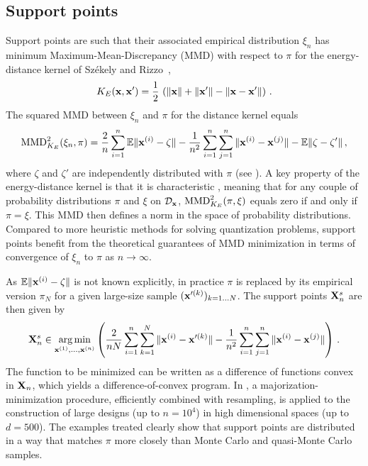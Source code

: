 \subsection{Support points}\label{sec:SP}
Support points \citep{mak_joseph_2018} are such that their associated empirical distribution $\xi_n$ has minimum Maximum-Mean-Discrepancy (MMD) with respect to $\pi$ for the energy-distance kernel of Sz\'ekely and Rizzo~\citep{szekely_rizzo_2013},
\begin{equation}\label{eq:kE}
K_E({\bf x},{\bf x}') = \frac12\, \left(\Vert {\bf x} \Vert + \Vert {\bf x}' \Vert - \Vert {\bf x}-{\bf x}' \Vert\right)\,.
\end{equation} 
The squared MMD between $\xi_n$ and $\pi$ for the distance kernel equals
\begin{equation}\label{eq:energySP}
\mathrm{MMD}_{K_E}^2(\xi_n,\pi) = \frac{2}{n} \sum_{i=1}^{n} \mathbb{E} \|{\bf x}^{(i)}-\zeta\| - \frac{1}{n^2} \sum_{i=1}^{n}\sum_{j=1}^{n} \|{\bf x}^{(i)}-{\bf x}^{(j)}\| - \mathbb{E} \|\zeta-\zeta'\| \,,
\end{equation}
where $\zeta$ and $\zeta'$ are independently distributed with $\pi$ (see \citealp{sejdinovic_2013}).
A key property of the energy-distance kernel is that it is characteristic \citep{sriperumbudur_2010}, meaning that for any couple of probability distributions $\pi$ and $\xi$ on $\mathcal{D}_{\bf x}$, $\mathrm{MMD}_{K_E}^2(\pi,\xi)$ equals zero if and only if $\pi=\xi$. 
This MMD then defines a norm in the space of probability distributions.
Compared to more heuristic methods for solving quantization problems, support points benefit from the theoretical guarantees of MMD minimization in terms of convergence of $\xi_n$ to $\pi$ as $n\to\infty$. 

As $\mathbb{E} \|{\bf x}^{(i)}-\zeta\|$ is not known explicitly, in practice $\pi$ is replaced by its empirical version $\pi_N$ for a given large-size sample $({\bf x}'^{(k)})_{k=1\ldots N}$. 
The support points ${\bf X}_n^s$ are then given by
\begin{equation}\label{eq:SPestim}
{\bf X}_n^s \in \operatorname*{arg\,min}_{{\bf x}^{(1)},\ldots,{\bf x}^{(n)}} \left( \frac{2}{n N} \sum_{i=1}^{n} \sum_{k=1}^N \|{\bf x}^{(i)}-{\bf x}'^{(k)}\| - \frac{1}{{n}^2} \sum_{i=1}^{n}\sum_{j=1}^{n} \|{\bf x}^{(i)}-{\bf x}^{(j)}\| \right) \,.
\end{equation}
The function to be minimized can be written as a difference of functions convex in ${\bf X}_n$, which yields a difference-of-convex program. 
In \citet{mak_joseph_2018}, a majorization-minimization procedure, efficiently combined with resampling, is applied to the construction of large designs (up to $n=10^4$) in high dimensional spaces (up to $d=500$). 
The examples treated clearly show that support points are distributed in a way that matches $\pi$ more closely than Monte Carlo and quasi-Monte Carlo samples.

